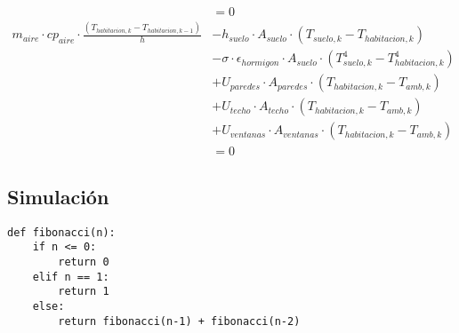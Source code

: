 \begin{align}
	                                                                                            & = 0                                                                                                     \\
	m_{aire} \cdot cp_{aire} \cdot \frac{\left(T_{habitacion,k} - T_{habitacion,k-1}\right)}{h} & - h_{suelo} \cdot A_{suelo} \cdot (T_{suelo,k} - T_{habitacion,k}) \nonumber                            \\
	                                                                                            & - \sigma \cdot \epsilon_{hormigon} \cdot A_{suelo} \cdot (T_{suelo,k}^4 - T_{habitacion,k}^4) \nonumber \\
	                                                                                            & + U_{paredes} \cdot A_{paredes} \cdot (T_{habitacion,k} - T_{amb,k}) \nonumber                          \\
	                                                                                            & + U_{techo} \cdot A_{techo} \cdot (T_{habitacion,k} - T_{amb,k}) \nonumber                              \\
	                                                                                            & + U_{ventanas} \cdot A_{ventanas} \cdot (T_{habitacion,k} - T_{amb,k}) \nonumber                        \\
	                                                                                            & = 0
\end{align}


\subsection{Simulación}



\begin{verbatim}
def fibonacci(n):
    if n <= 0:
        return 0
    elif n == 1:
        return 1
    else:
        return fibonacci(n-1) + fibonacci(n-2)
\end{verbatim}
